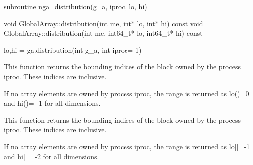 \documentclass[12pt]{article}
\begin{document}
\begin{fapi}
\begin{fcode}
subroutine nga_distribution(g_a, iproc, lo, hi)
\end{fcode}
\begin{funcargs}
\end{funcargs}
\end{fapi}

\begin{cxxapi}
\begin{cxxcode}
void GlobalArray::distribution(int me, int* lo, int* hi) const
void GlobalArray::distribution(int me, int64_t* lo, int64_t* hi) const
\end{cxxcode}
\begin{funcargs}
\end{funcargs}
\end{cxxapi}

\begin{pyapi}
\begin{pycode}
lo,hi = ga.distribution(int g_a, int iproc=-1)
\end{pycode}
\begin{funcargs}
\end{funcargs}
\end{pyapi}

\local

\begin{fdesc}
This function returns the bounding indices of the block owned by the process
iproc. These indices are inclusive.

If no array elements are owned by process iproc, the range is returned as
lo()=0 and hi()= -1 for all dimensions.
\end{fdesc}

\begin{cdesc}
This function returns the bounding indices of the block owned by the process
iproc. These indices are inclusive.

If no array elements are owned by process iproc, the range is returned as
lo[]=-1 and hi[]= -2 for all dimensions.
\end{cdesc}
\end{document}
